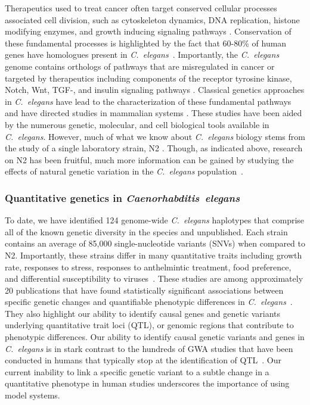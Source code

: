 \documentclass[12pt]{article}
\begin{document}
Therapeutics used to treat cancer often target conserved cellular processes associated cell division, such as cytoskeleton dynamics, DNA replication, histone modifying enzymes, and growth inducing signaling pathways \cite{Chabner:2005ie}. Conservation of these fundamental processes is highlighted by the  fact that 60-80\% of human genes have homologues present in {\it C.~elegans}~\cite{Kaletta:2006kc}. Importantly, the {\it C.~elegans} genome contains orthologs of pathways that are misregulated in cancer or targeted by therapeutics including components of the receptor tyrosine kinase, Notch, Wnt, TGF-\textbeta , and insulin signaling pathways \cite{Shaye:2011cc}. Classical genetics approaches in {\it C.~elegans} have lead to the characterization of these fundamental pathways and have directed studies in mammalian systems \cite{Wang:2011jy}. These studies have been aided by the numerous genetic, molecular, and cell biological tools available in {\it C.~elegans}. However, much of what we know about {\it C.~elegans} biology stems from the study of a single laboratory strain, N2 \cite{Brenner:1974wn}. Though, as indicated above, research on N2 has been fruitful, much more information can be gained by studying the effects of natural genetic variation in the {\it C.~elegans} population~\cite{GAERTNER:2011gl}. 
\vspace{-10pt}
\subsubsection{Quantitative genetics in \itshape  Caenorhabditis~elegans}

To date, we have identified 124 genome-wide {\it C.~elegans} haplotypes that comprise all of the known genetic diversity in the species \cite{Andersen:2012gm} and unpublished. Each strain contains an average of 85,000 single-nucleotide variants (SNVs) when compared to N2. Importantly, these strains differ in many quantitative traits including growth rate, responses to stress, responses to anthelmintic treatment, food preference, and differential susceptibility to viruses~\cite{Ghosh:2012fza,Ashe:2013bu,Glater:2014jf,Andersen:2015dm,Andersen:2014ec}. These studies are among approximately 20 publications that have found statistically significant associations between specific genetic changes and quantifiable phenotypic differences in {\it C.~elegans}~\cite{GAERTNER:2011gl}. They also highlight our ability to identify causal genes and genetic variants underlying quantitative trait loci (QTL), or genomic regions that contribute to phenotypic differences. Our ability to identify causal genetic variants and genes in {\it C.~elegans} is in stark contrast to the hundreds of GWA studies that have been conducted in humans that typically stop at the identification of QTL~\cite{Tasan:2015er}. Our current inability to link a specific genetic variant to a subtle change in a quantitative phenotype in human studies underscores the importance of using model systems.
\end{document}
